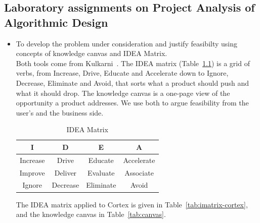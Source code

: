 \documentclass[oneside,a4paper,12pt]{report}
\begin{document}
\begin{appendices}
\chapter{Laboratory assignments on Project Analysis of Algorithmic Design}
\label{app:algo}
\begin{itemize}
\item To develop the problem under consideration and justify feasibilty using
concepts of knowledge canvas and IDEA Matrix.\\
Both tools come from Kulkarni~\cite{innovationbook}. The IDEA matrix (Table~\ref{tab:imatrix}) is a grid of verbs, from Increase, Drive, Educate and Accelerate down to Ignore, Decrease, Eliminate and Avoid, that sorts what a product should push and what it should drop. The knowledge canvas is a one-page view of the opportunity a product addresses. We use both to argue feasibility from the user's and the business side.\\

\begin{table}[!htbp]
\begin{center}
  \begin{tabular}{| c | c | c | c |}
\hline
 I & D & E & A \\
\hline
Increase & Drive & Educate & Accelerate \\
\hline
Improve & Deliver & Evaluate & Associate  \\
 \hline
Ignore & Decrease & Eliminate & Avoid \\
\hline
\end{tabular}
 \caption { IDEA Matrix }
 \label{tab:imatrix}
\end{center}
\end{table}

The IDEA matrix applied to Cortex is given in Table~\ref{tab:imatrix-cortex}, and the knowledge canvas in Table~\ref{tab:canvas}.


\end{itemize}
\end{appendices}
\end{document}
